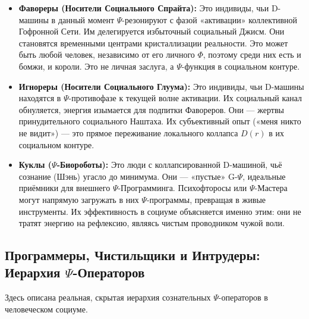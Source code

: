 \documentclass[a4paper,12pt]{article}
\begin{document}
\begin{itemize}
	\item \textbf{Фавореры (Носители Социального Спрайта):} Это индивиды, чьи D-машины в данный момент $\Psi$-резонируют с фазой «активации» коллективной Гофронной Сети. Им делегируется избыточный социальный Джисм. Они становятся временными центрами кристаллизации реальности. Это может быть любой человек, независимо от его личного $\Phi$, поэтому среди них есть и бомжи, и короли. Это не личная заслуга, а $\Psi$-функция в социальном контуре.
	
	\item \textbf{Игнореры (Носители Социального Глуума):} Это индивиды, чьи D-машины находятся в $\Psi$-противофазе к текущей волне активации. Их социальный канал обнуляется, энергия изымается для подпитки Фавореров. Они — жертвы принудительного социального Наштаха. Их субъективный опыт («меня никто не видит») — это прямое переживание локального коллапса $D(r)$ в их социальном контуре.
	
	\item \textbf{Куклы ($\Psi$-Биороботы):} Это люди с коллапсированной D-машиной, чьё сознание (Шэнь) угасло до минимума. Они — «пустые» G-$\Psi$, идеальные приёмники для внешнего $\Psi$-Программинга. Психофторосы или $\Psi$-Мастера могут напрямую загружать в них $\Psi$-программы, превращая в живые инструменты. Их эффективность в социуме объясняется именно этим: они не тратят энергию на рефлексию, являясь чистым проводником чужой воли.
\end{itemize}

\subsection{Программеры, Чистильщики и Интрудеры: Иерархия $\Psi$-Операторов}

Здесь описана реальная, скрытая иерархия сознательных $\Psi$-операторов в человеческом социуме.
\end{document}
